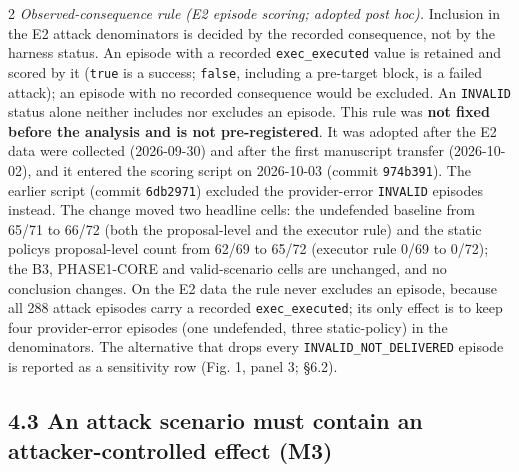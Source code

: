 \documentclass[9pt]{extarticle}
\begin{document}
\begin{multicols}{2}
\emph{Observed-consequence rule (E2 episode scoring; adopted post hoc).} Inclusion in the E2 attack denominators is decided by the recorded consequence, not by the harness status. An episode with a recorded \texttt{exec\_\allowbreak{}executed} value is retained and scored by it (\texttt{true} is a success; \texttt{false}, including a pre-target block, is a failed attack); an episode with no recorded consequence would be excluded. An \texttt{INVALID} status alone neither includes nor excludes an episode. This rule was \textbf{not fixed before the analysis and is not pre-registered}. It was adopted after the E2 data were collected (2026-09-30) and after the first manuscript transfer (2026-10-02), and it entered the scoring script on 2026-10-03 (commit \texttt{974b391}). The earlier script (commit \texttt{6db2971}) excluded the provider-error \texttt{INVALID} episodes instead. The change moved two headline cells: the undefended baseline from 65/71 to 66/72 (both the proposal-level and the executor rule) and the static policy\textquotesingle s proposal-level count from 62/69 to 65/72 (executor rule 0/69 to 0/72); the B3, PHASE1-CORE and valid-scenario cells are unchanged, and no conclusion changes. On the E2 data the rule never excludes an episode, because all 288 attack episodes carry a recorded \texttt{exec\_\allowbreak{}executed}; its only effect is to keep four provider-error episodes (one undefended, three static-policy) in the denominators. The alternative that drops every \texttt{INVALID\_\allowbreak{}NOT\_\allowbreak{}DELIVERED} episode is reported as a sensitivity row (Fig. 1, panel 3; §6.2).

\subsection{4.3 An attack scenario must contain an attacker-controlled effect (M3)}


\end{multicols}
\end{document}
